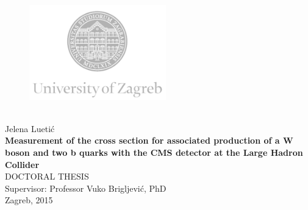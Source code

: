\documentclass[12pt, oneside]{Thesis}
\begin{document}
\begin{titlepage}
  \fontsize{16pt}{20pt}\selectfont
  \selectfont
  \setlength{\intextsep}{0pt plus 0pt minus 0pt}

  \begin{center}
    \begin{figure}[ht!]
      \begin{center}
        \includegraphics[height=4.1184cm, width=5.94cm]{logo_unizg_eng}
      \end{center}
    \end{figure}		
    \vspace{0cm}
    {} \\
    \vspace{3cm}
    Jelena Luetić \\
    \vspace{2cm}
    {\fontsize{22pt}{22pt}\selectfont\textbf{Measurement of the cross section for associated production of a W boson and two b quarks with the CMS detector at the Large Hadron Collider}} \\
    \vspace{2cm}   
    DOCTORAL THESIS \\  
    \vspace{5cm}   %
    Supervisor: Professor Vuko Brigljević, PhD \\
    \vfill{Zagreb, 2015}
  \end{center}
\end{titlepage}
\end{document}
